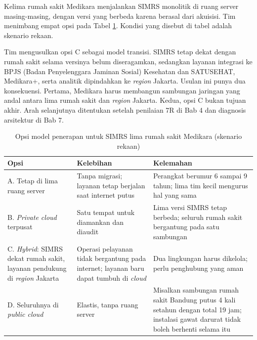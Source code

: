 \begin{kasus}[title={Kasus Medikara Health: Model Penerapan untuk SIMRS di Lima Rumah Sakit}]
  Kelima rumah sakit Medikara menjalankan SIMRS monolitik di ruang server masing-masing,
  dengan versi yang berbeda karena berasal dari akuisisi. Tim menimbang empat opsi pada
  Tabel \ref{tab:ch02-opsi-simrs}. Kondisi yang disebut di tabel adalah skenario rekaan.

  Tim mengusulkan opsi C sebagai model transisi. SIMRS tetap dekat dengan rumah sakit selama
  versinya belum diseragamkan, sedangkan layanan integrasi ke BPJS (Badan Penyelenggara
  Jaminan Sosial) Kesehatan dan SATUSEHAT, Medikara+, serta analitik dipindahkan ke
  \textit{region} Jakarta. Usulan ini punya dua konsekuensi. Pertama, Medikara harus
  membangun sambungan jaringan yang andal antara lima rumah sakit dan \textit{region}
  Jakarta. Kedua, opsi C bukan tujuan akhir. Arah selanjutnya ditentukan setelah penilaian
  7R di Bab 4 dan diagnosis arsitektur di Bab 7.
\end{kasus}

\begin{table}[!htb]
  \centering
  \caption{Opsi model penerapan untuk SIMRS lima rumah sakit Medikara (skenario rekaan)}
  \label{tab:ch02-opsi-simrs}
  \small
  \begin{tabularx}{\textwidth}{>{\raggedright\arraybackslash}p{2.6cm}
      >{\raggedright\arraybackslash}X >{\raggedright\arraybackslash}X}
    \hline
    \textbf{Opsi} & \textbf{Kelebihan} & \textbf{Kelemahan} \\
    \hline
    A. Tetap di lima ruang server & Tanpa migrasi; layanan tetap berjalan saat internet
      putus & Perangkat berumur 6 sampai 9 tahun; lima tim kecil mengurus hal yang sama \\
    \hline
    B. \textit{Private cloud} terpusat & Satu tempat untuk diamankan dan diaudit & Lima versi
      SIMRS tetap berbeda; seluruh rumah sakit bergantung pada satu sambungan \\
    \hline
    C. \textit{Hybrid}: SIMRS dekat rumah sakit, layanan pendukung di \textit{region}
      Jakarta & Operasi pelayanan tidak bergantung pada internet; layanan baru dapat tumbuh
      di \textit{cloud} & Dua lingkungan harus dikelola; perlu penghubung yang aman \\
    \hline
    D. Seluruhnya di \textit{public cloud} & Elastis, tanpa ruang server & Misalkan sambungan
      rumah sakit Bandung putus 4 kali setahun dengan total 19 jam; instalasi gawat darurat
      tidak boleh berhenti selama itu \\
    \hline
  \end{tabularx}
\end{table}


